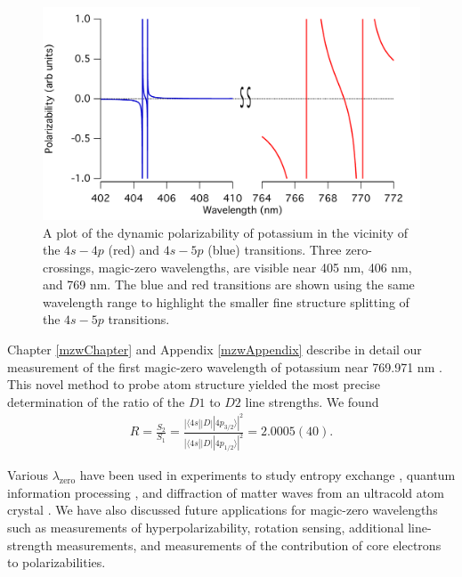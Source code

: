 \begin{figure}
\includegraphics[width=1\textwidth]{Figures/KredBlueMZWedit.pdf}
\caption[Dynamic polarizability and magic-zero wavelengths of K.]{\label{KredBlueMZWfig}A plot of the dynamic polarizability of potassium in the vicinity of the $4s-4p$ (red) and $4s-5p$ (blue) transitions. Three zero-crossings, magic-zero wavelengths, are visible near 405 nm, 406 nm, and 769 nm. The blue and red transitions are shown using the same wavelength range to highlight the smaller fine structure splitting of the $4s-5p$ transitions.}
\end{figure}


Chapter \ref{mzwChapter} and Appendix \ref{mzwAppendix} describe in detail our measurement of the first magic-zero wavelength of potassium near 769.971 nm \cite{Hol12a}. This novel method to probe atom structure yielded the most precise determination of the ratio of the $D1$ to $D2$ line strengths. We found
\begin{eqnarray}
\label{Reqn}
R=\frac{S_2}{S_1}=\frac{|\langle 4s || D || 4p_{3/2}\rangle|^2}{|\langle 4s || D || 4p_{1/2}\rangle|^2}=2.0005(40).
\end{eqnarray}


Various $\lambda_\textrm{zero}$ have been used in experiments to study entropy exchange \cite{Cat09}, quantum information processing \cite{Dal08}, and diffraction of matter waves from an ultracold atom crystal \cite{Gad12}. We have also discussed future applications for magic-zero wavelengths such as measurements of hyperpolarizability, rotation sensing, additional line-strength measurements, and measurements of the contribution of core electrons to polarizabilities.


